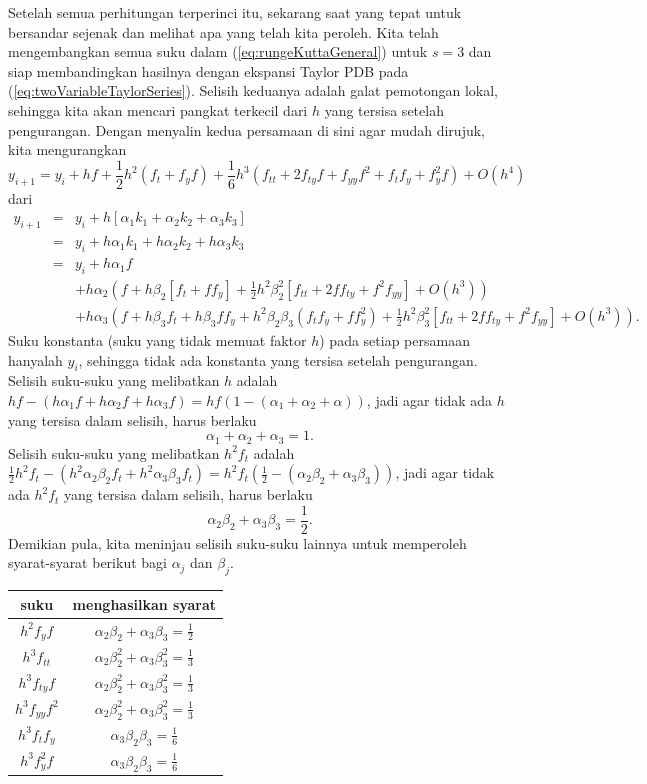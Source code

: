 Setelah semua perhitungan terperinci itu, sekarang saat yang tepat
untuk bersandar sejenak dan melihat apa yang telah kita peroleh. Kita
telah mengembangkan semua suku dalam (\ref{eq:rungeKuttaGeneral})
untuk $s=3$ dan siap membandingkan hasilnya dengan ekspansi Taylor
PDB pada (\ref{eq:twoVariableTaylorSeries}). Selisih keduanya adalah
galat pemotongan lokal, sehingga kita akan mencari pangkat terkecil
dari $h$ yang tersisa setelah pengurangan. Dengan menyalin kedua
persamaan di sini agar mudah dirujuk, kita mengurangkan
\[
y_{i+1}=y_{i}+hf+\frac{1}{2}h^{2}(f_{t}+f_{y}f)+\frac{1}{6}h^{3}(f_{tt}+2f_{ty}f+f_{yy}f^{2}+f_{t}f_{y}+f_{y}^{2}f)+O(h^{4})
\]
dari
\begin{eqnarray*}
y_{i+1} & = & y_{i}+h\left[\alpha_{1}k_{1}+\alpha_{2}k_{2}+\alpha_{3}k_{3}\right]\\
 & = & y_{i}+h\alpha_{1}k_{1}+h\alpha_{2}k_{2}+h\alpha_{3}k_{3}\\
 & = & y_{i}+h\alpha_{1}f\\
 &  & +h\alpha_{2}\left(f+h\beta_{2}\left[f_{t}+ff_{y}\right]+\frac{1}{2}h^{2}\beta_{2}^{2}\left[f_{tt}+2ff_{ty}+f^{2}f_{yy}\right]+O(h^{3})\right)\\
 &  & +h\alpha_{3}\left(f+h\beta_{3}f_{t}+h\beta_{3}ff_{y}+h^{2}\beta_{2}\beta_{3}(f_{t}f_{y}+ff_{y}^{2})+\frac{1}{2}h^{2}\beta_{3}^{2}\left[f_{tt}+2ff_{ty}+f^{2}f_{yy}\right]+O(h^{3})\right).
\end{eqnarray*}
Suku konstanta (suku yang tidak memuat faktor $h$) pada setiap persamaan
hanyalah $y_{i}$, sehingga tidak ada konstanta yang tersisa setelah
pengurangan. Selisih suku-suku yang melibatkan $h$ adalah $hf-(h\alpha_{1}f+h\alpha_{2}f+h\alpha_{3}f)=hf(1-(\alpha_{1}+\alpha_{2}+\alpha))$,
jadi agar tidak ada $h$ yang tersisa dalam selisih, harus berlaku
\[
\alpha_{1}+\alpha_{2}+\alpha_{3}=1.
\]
Selisih suku-suku yang melibatkan $h^{2}f_{t}$ adalah $\frac{1}{2}h^{2}f_{t}-(h^{2}\alpha_{2}\beta_{2}f_{t}+h^{2}\alpha_{3}\beta_{3}f_{t})=h^{2}f_{t}(\frac{1}{2}-(\alpha_{2}\beta_{2}+\alpha_{3}\beta_{3}))$,
jadi agar tidak ada $h^{2}f_{t}$ yang tersisa dalam selisih, harus
berlaku
\[
\alpha_{2}\beta_{2}+\alpha_{3}\beta_{3}=\frac{1}{2}.
\]
Demikian pula, kita meninjau selisih suku-suku lainnya untuk memperoleh
syarat-syarat berikut bagi $\alpha_{j}$ dan $\beta_{j}$.

\begin{center}
\begin{tabular}{cc}
suku & menghasilkan syarat\tabularnewline
\hline 
$h^{2}f_{y}f$ & $\alpha_{2}\beta_{2}+\alpha_{3}\beta_{3}=\frac{1}{2}$\tabularnewline
$h^{3}f_{tt}$ & $\alpha_{2}\beta_{2}^{2}+\alpha_{3}\beta_{3}^{2}=\frac{1}{3}$\tabularnewline
$h^{3}f_{ty}f$ & $\alpha_{2}\beta_{2}^{2}+\alpha_{3}\beta_{3}^{2}=\frac{1}{3}$\tabularnewline
$h^{3}f_{yy}f^{2}$ & $\alpha_{2}\beta_{2}^{2}+\alpha_{3}\beta_{3}^{2}=\frac{1}{3}$\tabularnewline
$h^{3}f_{t}f_{y}$ & $\alpha_{3}\beta_{2}\beta_{3}=\frac{1}{6}$\tabularnewline
$h^{3}f_{y}^{2}f$ & $\alpha_{3}\beta_{2}\beta_{3}=\frac{1}{6}$\tabularnewline
\end{tabular}
\par\end{center}

